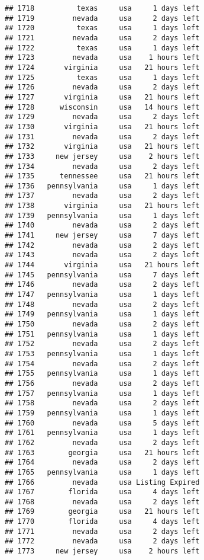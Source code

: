 \documentclass[
]{article}
\begin{document}
\begin{verbatim}
## 1718          texas     usa     1 days left
## 1719         nevada     usa     2 days left
## 1720          texas     usa     1 days left
## 1721         nevada     usa     2 days left
## 1722          texas     usa     1 days left
## 1723         nevada     usa    1 hours left
## 1724       virginia     usa   21 hours left
## 1725          texas     usa     1 days left
## 1726         nevada     usa     2 days left
## 1727       virginia     usa   21 hours left
## 1728      wisconsin     usa   14 hours left
## 1729         nevada     usa     2 days left
## 1730       virginia     usa   21 hours left
## 1731         nevada     usa     2 days left
## 1732       virginia     usa   21 hours left
## 1733     new jersey     usa    2 hours left
## 1734         nevada     usa     2 days left
## 1735      tennessee     usa   21 hours left
## 1736   pennsylvania     usa     1 days left
## 1737         nevada     usa     2 days left
## 1738       virginia     usa   21 hours left
## 1739   pennsylvania     usa     1 days left
## 1740         nevada     usa     2 days left
## 1741     new jersey     usa     7 days left
## 1742         nevada     usa     2 days left
## 1743         nevada     usa     2 days left
## 1744       virginia     usa   21 hours left
## 1745   pennsylvania     usa     7 days left
## 1746         nevada     usa     2 days left
## 1747   pennsylvania     usa     1 days left
## 1748         nevada     usa     2 days left
## 1749   pennsylvania     usa     1 days left
## 1750         nevada     usa     2 days left
## 1751   pennsylvania     usa     1 days left
## 1752         nevada     usa     2 days left
## 1753   pennsylvania     usa     1 days left
## 1754         nevada     usa     2 days left
## 1755   pennsylvania     usa     1 days left
## 1756         nevada     usa     2 days left
## 1757   pennsylvania     usa     1 days left
## 1758         nevada     usa     2 days left
## 1759   pennsylvania     usa     1 days left
## 1760         nevada     usa     5 days left
## 1761   pennsylvania     usa     1 days left
## 1762         nevada     usa     2 days left
## 1763        georgia     usa   21 hours left
## 1764         nevada     usa     2 days left
## 1765   pennsylvania     usa     1 days left
## 1766         nevada     usa Listing Expired
## 1767        florida     usa     4 days left
## 1768         nevada     usa     2 days left
## 1769        georgia     usa   21 hours left
## 1770        florida     usa     4 days left
## 1771         nevada     usa     2 days left
## 1772         nevada     usa     2 days left
## 1773     new jersey     usa    2 hours left

\end{verbatim}
\end{document}
